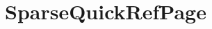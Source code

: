 \hypertarget{group___sparse_quick_ref_page}{}\section{Sparse\+Quick\+Ref\+Page}
\label{group___sparse_quick_ref_page}

